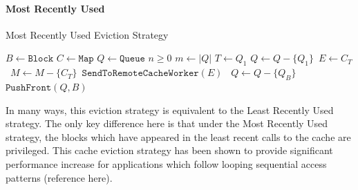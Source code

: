 \paragraph{Most Recently Used}
\begin{algorithm}
    \caption{Most Recently Used Eviction Strategy}
    \begin{algorithmic}[1]
        \State $B \gets \texttt{Block}$
        \State $C \gets \texttt{Map}$
        \State $Q \gets \texttt{Queue}$
        \State $n \ge 0$
        \State $m \gets |Q|$
                \State $T \gets Q_1$
                \State $Q \gets Q - \{Q_1\}$\
                \State $E \gets C_T$\
                \State $M \gets M - \{C_T\}$\
                \State $\texttt{SendToRemoteCacheWorker}(E)$\
            \EndIf
        \Else
            \State $Q \gets Q - \{Q_B\}$
        \EndIf
        \State $\texttt{PushFront}(Q, B)$
    \end{algorithmic}
\end{algorithm}
In many ways, this eviction strategy is equivalent to the Least Recently Used strategy. The only key difference here is that under the Most Recently Used strategy, the blocks which have appeared in the least recent calls to the cache are privileged. This cache eviction strategy has been shown to provide significant performance increase for applications which follow looping sequential access patterns (reference here).

